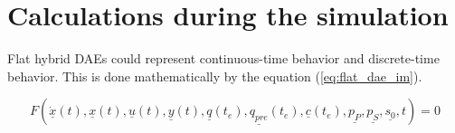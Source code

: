 % 




\appendix
\section{Calculations during the simulation}\label{app:calculations}

Flat hybrid DAEs could represent continuous-time behavior and
discrete-time behavior. This is done mathematically by the equation
(\ref{eq:flat_dae_im}).

\begin{equation}\label{eq:flat_dae_im}
	F(	\underline{\dot x}(t),
	\underline{x}(t),
	\underline{u}(t),
	\underline{y}(t),
	\underline{q}(t_e),
	\underline{q_{pre}}(t_e),
	\underline{c}(t_e),
	\underline{p_{P}},
	\underline{p_{S}},
	\underline{s_0},
	t) = 0
\end{equation}

